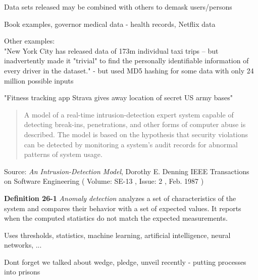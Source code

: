 \documentclass[Screen16to9,17pt]{foils}
\begin{document}
\begin{list1}
\item Data sets released may be combined with others to demask users/persons
\item Book examples, governor medical data - health records, Netflix data
\item Other examples:\\
"New York City has released data of 173m individual taxi trips – but inadvertently made it "trivial" to find the personally identifiable information of every driver in the dataset." - but used MD5 hashing for some data with only 24 million possible inputs\\
{\footnotesize{}}
\item "Fitness tracking app Strava gives away location of secret US army bases"\\
{\footnotesize{}}
\end{list1}




\begin{quote}
A model of a real-time intrusion-detection expert system capable of detecting break-ins, penetrations, and other forms of computer abuse is described. The model is based on the hypothesis that security violations can be detected by monitoring a system's audit records for abnormal patterns of system usage.
\end{quote}
Source: \emph{An Intrusion-Detection Model}, Dorothy E. Denning
IEEE Transactions on Software Engineering ( Volume: SE-13 , Issue: 2 , Feb. 1987 )

\begin{list1}
\item {\bf Definition 26-1} \emph{Anomaly detection} analyzes a set of characteristics of the system and compares their behavior with a set of expected values. It reports when the computed statistics do not match the expected measurements.
\item Uses thresholds, statistics, machine learning, artificial intelligence, neural networks, ...
\item Dont forget we talked about wedge, pledge, unveil recently - putting processes into prisons
\end{list1}
\end{document}
